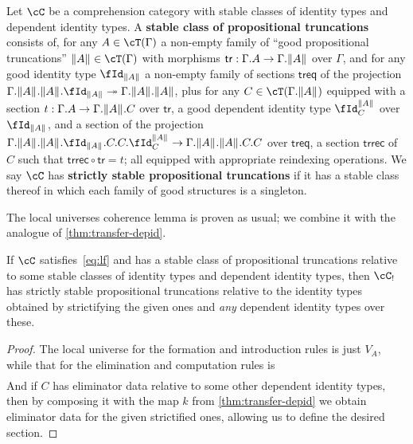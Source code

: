 \documentclass[referee]{psp}
\let\C\cC
\let\T\cT
\def\tr{\mathsf{tr}}
\def\treq{\mathsf{treq}}
\def\trrec{\mathsf{trrec}}
\let\Id\fId
\begin{document}
\begin{defn}\label{defn:proptrunc}
  Let $\C$ be a comprehension category with stable classes of identity types and dependent identity types.
  A \textbf{stable class of propositional truncations} consists of, for any $A\in\T(\Gamma)$ a non-empty family of ``good propositional truncations'' $\brck A\in\T(\Gamma)$ with morphisms $\tr: \Gamma.A \to \Gamma.\brck A$ over $\Gamma$, and for any good identity type $\Id_{\brck A}$ a non-empty family of sections $\treq$ of the projection $\Gamma.\brck A.\brck A.\Id_{\brck A} \fib \Gamma.\brck A.\brck A$, plus for any $C\in\T(\Gamma.\brck A)$ equipped with a section $t:\Gamma.A\to\Gamma.\mathopen{}\left\Vert A\right\Vert_{}\mathclose{}.C$ over $\tr$, a good dependent identity type $\Id^{\brck A}_C$ over $\Id_{\brck A}$, and a section of the projection $\Gamma.\brck A.\brck A.\Id_{\brck A}.C.C.\Id^{\brck A}_C \to \Gamma.\brck A.\brck A.C.C$ over  $\treq$, a section $\trrec$ of $C$ such that $\trrec \circ \tr = t$; all equipped with appropriate reindexing operations.
  We say $\C$ has \textbf{strictly stable propositional truncations} if it has a stable class thereof in which each family of good structures is a singleton.
\end{defn}

The local universes coherence lemma is proven as usual; we combine it with the analogue of \cref{thm:transfer-depid}.

\begin{lem}
  If $\C$ satisfies~\eqref{eq:lf} and has a stable class of propositional truncations relative to some stable classes of identity types and dependent identity types, then $\C_!$ has strictly stable propositional truncations relative to the identity types obtained by strictifying the given ones and \emph{any} dependent identity types over these.
\end{lem}
\begin{proof}
  The local universe for the formation and introduction rules is just $V_A$, while that for the elimination and computation rules is
  \begin{align*}
    [& a:V_A,\\
    &c:\prod z:E_{\brck A}(a) . V_C \\
    &t:\prod x:E_{A}(a) . E_C(c(\tr(x))) \\
    &d:\prod x,y:E_{\brck A}(a), u:E_C(c(x)), v:E_C(c(y)) . E_{\Id^{\brck A}_C}(a,x,y,u,v) ]
  \end{align*}
  And if $C$ has eliminator data relative to some other dependent identity types, then by composing it with the map $k$ from \cref{thm:transfer-depid} we obtain eliminator data for the given strictified ones, allowing us to define the desired section.
\end{proof}
\end{document}
